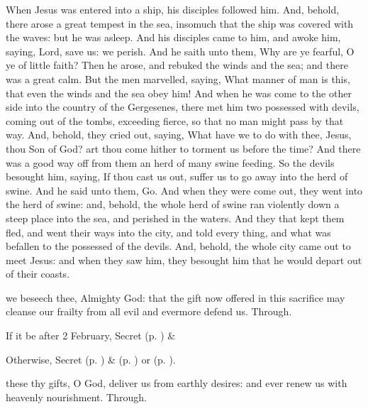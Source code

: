  When Jesus was entered into a ship, his disciples followed him. And, behold, there arose a great tempest in the sea, insomuch that the ship was covered with the waves: but he was asleep. And his disciples came to him, and awoke him, saying, Lord, save us: we perish. And he saith unto them, Why are ye fearful, O ye of little faith? Then he arose, and rebuked the winds and the sea; and there was a great calm. But the men marvelled, saying, What manner of man is this, that even the winds and the sea obey him! And when he was come to the other side into the country of the Gergesenes, there met him two possessed with devils, coming out of the tombs, exceeding fierce, so that no man might pass by that way. And, behold, they cried out, saying, What have we to do with thee, Jesus, thou Son of God? art thou come hither to torment us before the time? And there was a good way off from them an herd of many swine feeding. So the devils besought him, saying, If thou cast us out, suffer us to go away into the herd of swine. And he said unto them, Go. And when they were come out, they went into the herd of swine: and, behold, the whole herd of swine ran violently down a steep place into the sea, and perished in the waters. And they that kept them fled, and went their ways into the city, and told every thing, and what was befallen to the possessed of the devils. And, behold, the whole city came out to meet Jesus: and when they saw him, they besought him that he would depart out of their coasts.


\secret
{} we beseech thee, Almighty God: that the gift now offered in this sacrifice may cleanse our frailty from all evil and evermore defend us. Through.
\begin{rubric}
    If it be after 2 February,  Secret  (p. \pageref{SPSaints}) \&  
\end{rubric}
\begin{rubric}
	Otherwise,  Secret  (p. \pageref{SPMaryPostChristmas}) \&   (p. \pageref{SPAgainst}) or  (p. \pageref{SPChiefBishop}).
\end{rubric}
\postcommunion
{} these thy gifts, O God, deliver us from earthly desires: and ever renew us with heavenly nourishment. Through.

